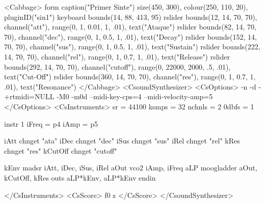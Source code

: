 <Cabbage>
form caption("Primer Sinte") size(450, 300), colour(250, 110, 20), pluginID("sin1")
keyboard bounds(14, 88, 413, 95)
rslider bounds(12, 14, 70, 70), channel("att"), range(0, 1, 0.01, 1, .01), text("Ataque")
rslider bounds(82, 14, 70, 70), channel("dec"), range(0, 1, 0.5, 1, .01), text("Decay")
rslider bounds(152, 14, 70, 70), channel("sus"), range(0, 1, 0.5, 1, .01), text("Sustain")
rslider bounds(222, 14, 70, 70), channel("rel"), range(0, 1, 0.7, 1, .01), text("Release")
rslider bounds(292, 14, 70, 70), channel("cutoff"), range(0, 22000, 2000, .5, .01), text("Cut-Off")
rslider bounds(360, 14, 70, 70), channel("res"), range(0, 1, 0.7, 1, .01), text("Resonance")
</Cabbage>
<CsoundSynthesizer>
<CsOptions>
-n -d -+rtmidi=NULL -M0 -m0d --midi-key-cps=4 --midi-velocity-amp=5
</CsOptions>
<CsInstruments>
sr = 44100
ksmps = 32
nchnls = 2
0dbfs = 1

instr 1
iFreq = p4
iAmp = p5

iAtt chnget "ata"
iDec chnget "dec"
iSus chnget "sus"
iRel chnget "rel"
kRes chnget "res"
kCutOff chnget "cutoff"

kEnv madsr iAtt, iDec, iSus, iRel 
aOut vco2 iAmp, iFreq
aLP moogladder aOut, kCutOff, kRes
outs aLP*kEnv, aLP*kEnv
endin

</CsInstruments>
<CsScore>
f0 z
</CsScore>
</CsoundSynthesizer>